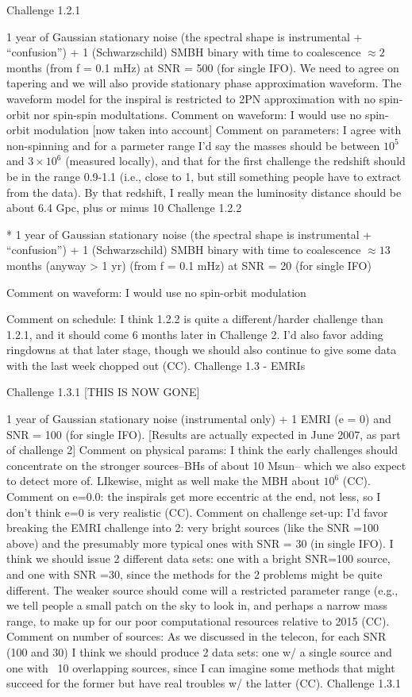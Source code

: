 \documentclass[11pt]{report}
\begin{document}
Challenge 1.2.1

1 year of Gaussian stationary noise (the spectral shape is instrumental + “confusion”) + 1 (Schwarzschild) SMBH binary with time to coalescence $\approx 2$ months (from f = 0.1 mHz) at SNR = 500 (for single IFO). We need to agree on tapering and we will also provide stationary phase approximation waveform. The waveform model for the inspiral is restricted to 2PN approximation with no spin-orbit nor spin-spin modultations.
  Comment on waveform: I would use no spin-orbit modulation [now taken into account]
  Comment on parameters: I agree with non-spinning and for a parmeter range I'd say the masses should 
  be between $10^5$ and $3\times 10^6$ (measured locally), and that for the first challenge the redshift should 
  be in the range 0.9-1.1 (i.e., close to 1, but still something people have to extract from the data).
  By that redshift, I really mean the luminosity distance should be about 6.4 Gpc, plus or minus 10%
Challenge 1.2.2

* 1 year of Gaussian stationary noise (the spectral shape is instrumental + “confusion”) + 1 (Schwarzschild) SMBH binary with time to coalescence $\approx 13$ months (anyway > 1 yr) (from f = 0.1 mHz) at SNR = 20 (for single IFO)

 Comment on waveform: I would use no spin-orbit modulation
 
 Comment on schedule: I think 1.2.2 is quite a different/harder challenge than 1.2.1, and it should come 6 months later in 
 Challenge 2. I'd also favor adding ringdowns at that later stage, though we should also continue to give some
 data with the last week chopped out (CC). 
Challenge 1.3 - EMRIs

Challenge 1.3.1 [THIS IS NOW GONE]

1 year of Gaussian stationary noise (instrumental only) + 1 EMRI (e = 0) and SNR = 100 (for single IFO). [Results are actually expected in June 2007, as part of challenge 2]
Comment on physical params: I think the early challenges should concentrate on the stronger sources--BHs of about 10 Msun--
which we also expect to detect more of. LIkewise, might as well make the MBH about $10^6$ (CC).
Comment on e=0.0: the inspirals get more eccentric at the end, not less, so I don't think e=0 is very realistic (CC).
Comment on challenge set-up: I'd favor breaking the EMRI challenge into 2: very bright sources (like the SNR =100 above) and 
the presumably more typical ones with SNR = 30 (in single IFO).  I think we should issue 2 different data sets: one with
a bright SNR=100 source, and one with SNR =30, since the methods for the 2 problems might be quite different.  The weaker
source should come will a restricted parameter range (e.g., we tell people a small patch on the sky to look in, and perhaps
a narrow mass range, to make up for our poor computational resources relative to 2015 (CC).
Comment on number of sources: As we discussed in the telecon, for each SNR (100 and 30) I think we should produce 2 data
sets: one w/ a single source and one with ~10 overlapping sources, since I can imagine some methods that might succeed for
the former but have real troubles w/ the latter (CC).
Challenge 1.3.1
\end{document}
